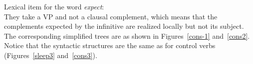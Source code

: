 \eas
Lexical item for the word \emph{expect}:\\
\zs
They take a VP and not a clausal complement, which means that the complements expected by the
infinitive are realized locally but not its subject. The  corresponding simplified trees are as
shown in Figures~\ref{cons-1} and~\ref{cons2}. Notice that the syntactic structures are the same as for control verbs (Figures~\ref{sleep3} and~\ref{cons3}). 
